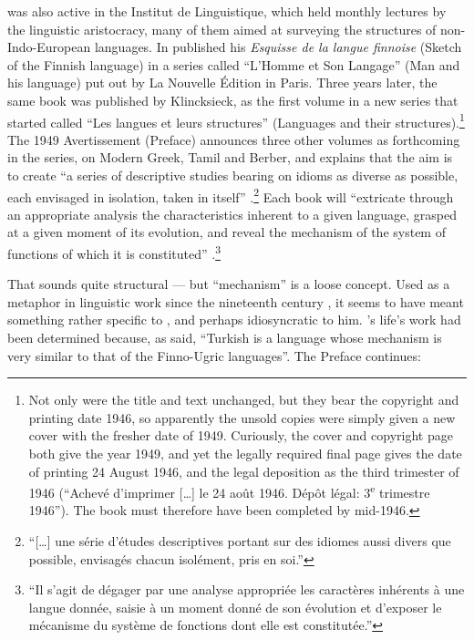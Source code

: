 \documentclass[output=paper]{langscibook}
\begin{document}
{\Sauvageot} was also active in the Institut de Linguistique, which held monthly lectures by the linguistic aristocracy, many of them aimed at surveying the structures of non-Indo-European languages. In \citeyear{Sauvageot1946} {\Sauvageot} published his \emph{Esquisse de la langue finnoise} (Sketch of the Finnish language) in a series called ``L’Homme et Son Langage'' (Man and his language) put out by La Nouvelle Édition in Paris. Three years later, the same book was published by Klincksieck, as the first volume in a new series that {\Sauvageot} started called ``Les langues et leurs structures'' (Languages and their structures).\footnote{Not only were the title and text unchanged, but they bear the copyright and printing date 1946, so apparently the unsold copies were simply given a new cover with the fresher date of 1949. Curiously, the cover and copyright page both give the year 1949, and yet the legally required final page gives the date of printing 24 August 1946, and the legal deposition as the third trimester of 1946 (``Achevé d'imprimer […] le 24 août 1946. Dépôt légal: 3\textsuperscript{e} trimestre 1946''). The book must therefore have been completed by mid-1946.} The 1949 Avertissement (Preface) announces three other volumes as forthcoming in the series, on Modern Greek, Tamil and Berber, and explains that the aim is to create ``a series of descriptive studies bearing on idioms as diverse as possible, each envisaged in isolation, taken in itself'' \citep[7]{Sauvageot1946}.\footnote{``[…] une série d'études descriptives portant sur des idiomes aussi divers que possible, envisagés chacun isolément, pris en soi.''} Each book will ``extricate through an appropriate analysis the characteristics inherent to a given language, grasped at a given moment of its evolution, and reveal the mechanism of the system of functions of which it is constituted'' \citep[7]{Sauvageot1946}.\footnote{``Il s'agit de dégager par une analyse appropriée les caractères inhérents à une langue donnée, saisie à un moment donné de son évolution et d'exposer le mécanisme du système de fonctions dont elle est constitutée.''}

That sounds quite structural — but ``mechanism'' is a loose concept. Used as a metaphor in linguistic work since the nineteenth century \citep[see][]{Joseph2018hj}, it seems to have meant something rather specific to {\Sauvageot}, and perhaps idiosyncratic to him. {\Sauvageot}'s life's work had been determined because, as {\Meillet} said, ``Turkish is a language whose mechanism is very similar to that of the Finno-Ugric languages''. The Preface continues:
\end{document}
